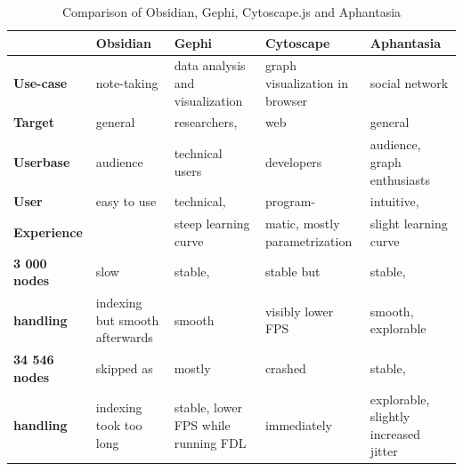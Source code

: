 \begin{table}[ht]
    \centering
    \caption{Comparison of Obsidian, Gephi, Cytoscape.js and Aphantasia}
    \label{tab:comparison_2}
    \begin{tabularx}{\textwidth}{|l|X|X|X|X|}
        \hline
        \textbf{}                     & \textbf{Obsidian}       & \textbf{Gephi}                      & \textbf{Cytoscape}                & \textbf{Aphantasia} \\ \hline
        \textbf{Use-case}             & note-taking             & data analysis and visualization     & graph visualization in browser    & social network \\ \hline
        \textbf{Target}               & general                 & researchers,                        & web                               & general \\ 
        \textbf{Userbase}             &  audience               & technical users                     & developers                        & audience, graph enthusiasts \\ \hline
        \textbf{User}                 & easy to use             & technical,                          & program-                          & intuitive, \\
        \textbf{Experience}           &                         & steep learning curve                & matic, mostly parametrization     & slight learning curve\\ \hline
        \textbf{3 000 nodes}          & slow                    & stable,                             & stable but                        & stable, \\ 
        \textbf{handling}             & indexing but smooth afterwards & smooth                              & visibly lower FPS                 & smooth, explorable \\ \hline
        \textbf{34 546 nodes}         & skipped as              & mostly                              & crashed                           & stable, \\ 
        \textbf{handling}             & indexing took too long  & stable, lower FPS while running FDL & immediately                       & explorable, slightly increased jitter \\ \hline
    \end{tabularx}
\end{table}